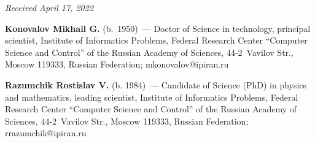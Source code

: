 \vspace*{-6pt}

\hfill{\small\textit{Received April 17, 2022}}
  

\Contr

\noindent
\textbf{Konovalov Mikhail G.} (b.\ 1950)~--- Doctor of Science in technology, principal 
scientist, Institute of Informatics Problems, Federal Research Center ``Computer Science and 
Control'' of the Russian Academy of Sciences, 44-2~Vavilov Str., Moscow 119333, Russian 
Federation; \mbox{mkonovalov@ipiran.ru }

\vspace*{3pt}

\noindent
\textbf{Razumchik Rostislav V.} (b. 1984)~--- Candidate of Science (PhD) in physics and 
mathematics, leading scientist, Institute of Informatics Problems, Federal Research Center 
``Computer Science and Control'' of the Russian Academy of Sciences, 44-2~Vavilov Str., 
Moscow 119333, Russian Federation; \mbox{rrazumchik@ipiran.ru}



\label{end\stat}

\renewcommand{\bibname}{\protect\rm Литература}    